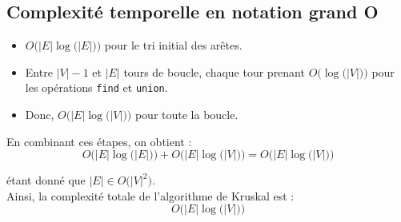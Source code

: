 \documentclass{article}
\begin{document}
    \newpage
    \subsection{Complexité temporelle en notation grand O}

    \begin{itemize}
        \item $O\Big(|E| \log \big(|E|\big)\Big)$ pour le tri initial des arêtes.
        \item Entre \(|V| - 1\) et \(|E|\) tours de boucle, chaque tour prenant \(O\Big(\log \big(|V|\big)\Big)\) pour les opérations \texttt{find} et \texttt{union}.
        \item Donc, $O\Big(|E| \log \big(|V|\big)\Big)$ pour toute la boucle.
    \end{itemize}

    En combinant ces étapes, on obtient :
    \[
    O\Big(|E| \log \big(|E|\big)\Big) + O\Big(|E| \log \big(|V|\big)\Big) = O\Big(|E| \log \big(|V|\big)\Big)
    \]
    
    étant donné que \(|E| \in O\big(|V|^2\big)\). \\
    
    Ainsi, la complexité totale de l'algorithme de Kruskal est :
    \[
    O\Big(|E| \log \big(|V|\big)\Big)
    \]
\end{document}
